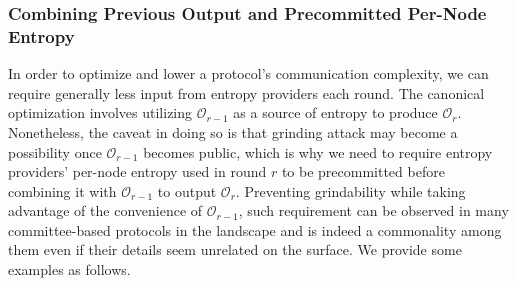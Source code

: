 \documentclass[letterpaper,twocolumn,10pt]{article}
\theoremstyle{definition}
\theoremstyle{remark}
\begin{document}
\subsubsection{Combining Previous Output and Precommitted Per-Node Entropy}
\label{subsubsection:precommitted}
In order to optimize and lower a protocol's communication complexity, we can require generally less input from entropy providers each round. The canonical optimization involves utilizing $\mathcal{O}_{r - 1}$ as a source of entropy to produce $\mathcal{O}_{r}$. Nonetheless, the caveat in doing so is that grinding attack may become a possibility once $\mathcal{O}_{r - 1}$ becomes public, which is why we need to require entropy providers' per-node entropy used in round $r$ to be precommitted before combining it with $\mathcal{O}_{r - 1}$ to output $\mathcal{O}_r$. Preventing grindability while taking advantage of the convenience of $\mathcal{O}_{r - 1}$, such requirement can be observed in many committee-based protocols in the landscape and is indeed a commonality among them even if their details seem unrelated on the surface. We provide some examples as follows.
\end{document}
